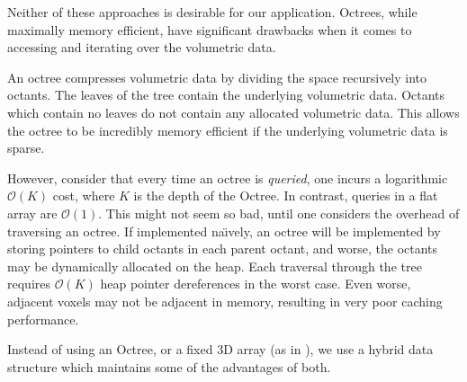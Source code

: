 Neither of these approaches is desirable for our application. Octrees, while
maximally memory efficient, have significant drawbacks when it comes to
accessing and iterating over the volumetric data.

An octree compresses volumetric data by dividing the space recursively into
octants. The leaves of the tree contain the underlying volumetric data. Octants
which contain no leaves do not contain any allocated volumetric data. This
allows the octree to be incredibly memory efficient if the underlying
volumetric data is sparse.

However, consider that every time an octree is \emph{queried}, one incurs a
logarithmic $\mathcal{O}(K)$ cost, where $K$ is the depth of the Octree. In
contrast, queries in a flat array are $\mathcal{O}(1)$. This might not seem so
bad, until one considers the overhead of traversing an octree. If implemented na\"{\i}vely, an
octree will be implemented by storing pointers to child octants in each parent
octant, and worse, the octants may be dynamically allocated on the heap. Each
traversal through the tree requires $\mathcal{O}(K)$ heap pointer
dereferences in the worst case. Even worse, adjacent voxels may not be adjacent
in memory, resulting in very poor caching performance.

Instead of using an Octree, or a fixed 3D array (as in \cite{Newcombe,
Whelan2013}), we use a hybrid data structure which maintains some of the
advantages of both. 

